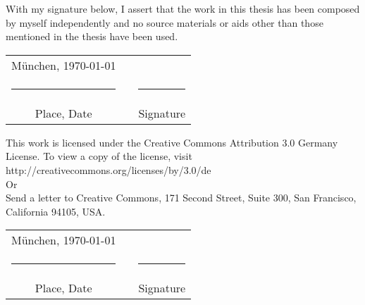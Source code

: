 \thispagestyle{plain}
\vspace*{1cm}
With my signature below, I assert that the work in this thesis has been composed by myself independently and no source materials or aids other than those mentioned in the thesis have been used.



\vspace{2cm}

\hspace{1cm}\begin{tabular}{ccc}
\vspace{-0.3cm}M\"unchen, \today 	&\hspace{4cm} 		& \\
\rule{4.5cm}{0.4pt}					&					&\rule{4.5cm}{0.4pt}\\
Place, Date							&					& Signature			
\end{tabular}

           		





\vspace{4cm}
This work is licensed under the Creative Commons Attribution 3.0 Germany License. To view a copy of the license, visit http://creativecommons.org/licenses/by/3.0/de\\

Or\\

Send a letter to Creative Commons, 171 Second Street, Suite 300, San Francisco, California 94105, USA.

\vspace{2cm}



\hspace{1cm}\begin{tabular}{ccc}
\vspace{-0.3cm}M\"unchen, \today 	&\hspace{4cm} 		& \\
\rule{4.5cm}{0.4pt}					&					&\rule{4.5cm}{0.4pt}\\
Place, Date							&					& Signature	
\end{tabular}